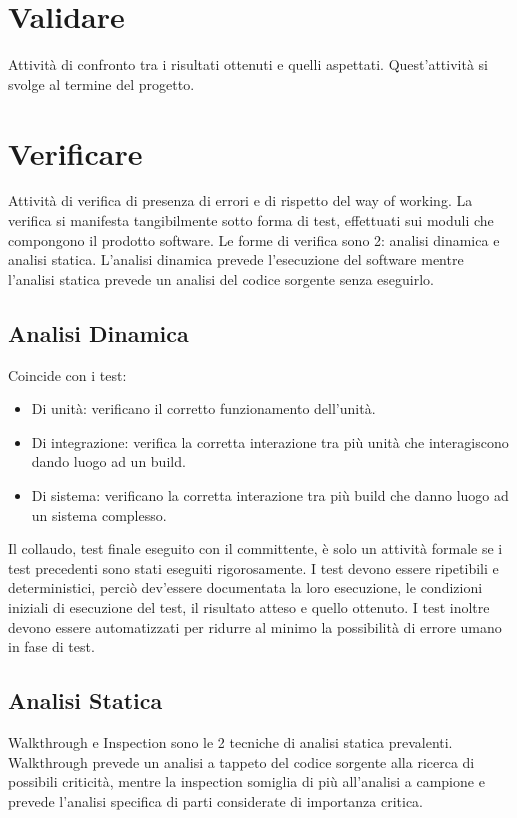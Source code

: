 	\section{Validare}
	\label{sec:validare}
	Attività di confronto tra i risultati ottenuti e quelli aspettati. Quest'attività si svolge al termine del progetto.
	
	\section{Verificare}
	\label{sec:verificare}
	Attività di verifica di presenza di errori e di rispetto del way of working. La verifica si manifesta tangibilmente sotto forma di test, effettuati sui moduli che compongono il prodotto software. Le forme di verifica sono 2: analisi dinamica e analisi statica. L'analisi dinamica prevede l'esecuzione del software mentre l'analisi statica prevede un analisi del codice sorgente senza eseguirlo. 
	\subsection{Analisi Dinamica}
	Coincide con i test: 
	\begin{itemize}  
	\item Di unità: verificano il corretto funzionamento dell'unità.
	\item Di integrazione: verifica la corretta interazione tra più unità che interagiscono dando luogo ad un build.
	\item Di sistema: verificano la corretta interazione tra più build che danno luogo ad un sistema complesso.
	\end{itemize}	
	Il collaudo, test finale eseguito con il committente, è solo un attività formale se i test precedenti sono stati eseguiti rigorosamente. I test devono essere ripetibili e deterministici, perciò dev'essere documentata la loro esecuzione, le condizioni iniziali di esecuzione del test, il risultato atteso e quello ottenuto. I test inoltre devono essere automatizzati per ridurre al minimo la possibilità di errore umano in fase di test.
	\subsection{Analisi Statica}
	Walkthrough e Inspection sono le 2 tecniche di analisi statica prevalenti. Walkthrough prevede un analisi a tappeto del codice sorgente alla ricerca di possibili criticità, mentre la inspection somiglia di più all'analisi a campione e prevede l'analisi specifica di parti considerate di importanza critica.
	
